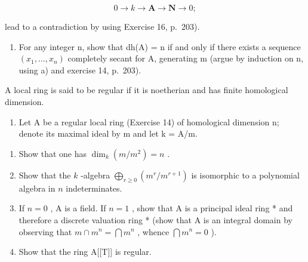 \[
0 \to k \to \mathbf {A} \to \mathbf {N} \to 0;
\]

lead to a contradiction by using Exercise 16, p.~203).

\begin{enumerate}
\def\labelenumi{\alph{enumi})}
\setcounter{enumi}{1}
\tightlist
\item
  For any integer n, show that dh(A) = n if and only if there exists a sequence \((x_{1}, \ldots, x_{n})\) completely secant for A, generating m (argue by induction on n, using a) and exercise 14, p.~203).
\end{enumerate}

A local ring is said to be regular if it is noetherian and has finite homological dimension.

\begin{enumerate}
\def\labelenumi{\arabic{enumi})}
\setcounter{enumi}{12}
\tightlist
\item
  Let A be a regular local ring (Exercise 14) of homological dimension n; denote its maximal ideal by m and let k = A/m.
\end{enumerate}

\begin{enumerate}
\def\labelenumi{\alph{enumi})}
\item
  Show that one has \(\dim_k(m/m^2) = n\) .
\item
  Show that the \(k\) -algebra \(\bigoplus_{r\geqslant 0}(m^{r} / m^{r + 1})\) is isomorphic to a polynomial algebra in \(n\) indeterminates.
\item
  If \(n = 0\) , A is a field. If \(n = 1\) , show that A is a principal ideal ring * and therefore a discrete valuation ring * (show that A is an integral domain by observing that \(m \cap m^n = \bigcap m^n\) , whence \(\bigcap m^n = 0\) ).
\item
  Show that the ring A{[}{[}T{]}{]} is regular.
\end{enumerate}

